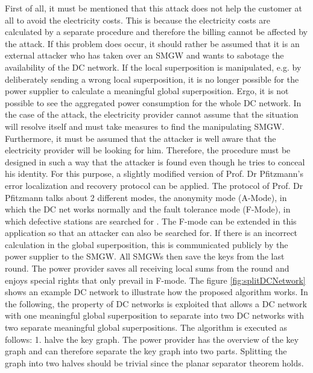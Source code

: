 First of all, it must be mentioned that this attack does not help the customer at all to avoid the electricity costs. This is because the electricity costs are calculated by a separate procedure and therefore the billing cannot be affected by the attack. If this problem does occur, it should rather be assumed that it is an external attacker who has taken over an SMGW and wants to sabotage the availability of the DC network.
If the local superposition is manipulated, e.g. by deliberately sending a wrong local superposition, it is no longer possible for the power supplier to calculate a meaningful global superposition. Ergo, it is not possible to see the aggregated power consumption for the whole DC network. In the case of the attack, the electricity provider cannot assume that the situation will resolve itself and must take measures to find the manipulating SMGW. Furthermore, it must be assumed that the attacker is well aware that the electricity provider will be looking for him. Therefore, the procedure must be designed in such a way that the attacker is found even though he tries to conceal his identity.
For this purpose, a slightly modified version of Prof. Dr Pfitzmann's error localization and recovery protocol can be applied. The protocol of Prof. Dr Pfitzmann talks about 2 different modes, the anonymity mode (A-Mode), in which the DC net works normally and the fault tolerance mode (F-Mode), in which defective stations are searched for .
The F-mode can be extended in this application so that an attacker can also be searched for. If there is an incorrect calculation in the global superposition, this is communicated publicly by the power supplier to the SMGW. All SMGWs then save the keys from the last round. The power provider saves all receiving local sums from the round and enjoys special rights that only prevail in F-mode. The figure \ref{fig:splitDCNetwork} shows an example DC network to illustrate how the proposed algorithm works.
In the following, the property of DC networks is exploited that allows a DC network with one meaningful global superposition to separate into two DC networks with two separate meaningful global superpositions.
The algorithm is executed as follows:
1. halve the key graph. 
The power provider has the overview of the key graph and can therefore separate the key graph into two parts. Splitting the graph into two halves should be trivial since the planar separator theorem holds.
